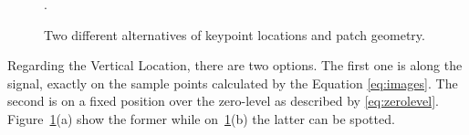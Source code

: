 \begin{figure}[h!]
\centering
{}
\caption[Keypoint Locations]{Two different alternatives of keypoint locations and patch geometry.}.
\label{fig:keypointlocations}
\end{figure}

Regarding the Vertical Location, there are two options.  The first one is along the signal, exactly on the sample points calculated by the Equation \ref{eq:images}.  The second is on a fixed position over the zero-level as described by \ref{eq:zerolevel}.  Figure~\ref{fig:keypointlocations}(a) show the former while on~\ref{fig:keypointlocations}(b) the latter can be spotted.

